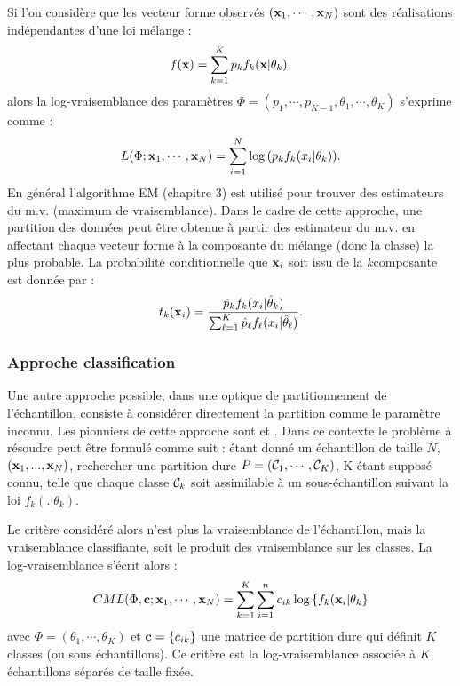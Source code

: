 Si l'on consid\`ere que les vecteur forme observ\'es 
$(\mbox{\bf x}_1,\cdots,\mbox{\bf x}_N)$ sont des r\'ealisations ind\'ependantes
d'une loi m\'elange :
$$
f(\mbox{\bf x})=\sum_{k=1}^K p_k f_k(\mbox{\bf x} | \theta_k),
$$
alors la log-vraisemblance des param\`etres 
$\Phi=(p_1,\cdots,p_{K-1},\theta_1,\cdots,\theta_K)$
s'exprime comme :
$$
L(\Phi ; \mbox{\bf x}_1,\cdots,\mbox{\bf x}_N)= \sum_{i=1}^{N} \log{ \left(p_k f_k(x_i | \theta_k)    \right )}.
$$
En g\'en\'eral l'algorithme EM (chapitre 3) est utilis\'e pour trouver
des estimateurs du m.v. (maximum de vraisemblance). Dans le cadre de cette
approche, une partition des donn\'ees peut \^etre obtenue \`a partir 
des estimateur du m.v. en affectant chaque vecteur forme \`a la 
composante du m\'elange (donc la classe) la plus probable. La 
probabilit\'e conditionnelle que $\mbox{\bf x}_i$ soit issu de la 
$k$\ieme composante est donn\'ee par :
\begin{equation}
\label{eq:tkxi}
t_k(\mbox{\bf x}_i)=\frac{\hat{p}_k f_k(x_i | \hat{\theta}_k) }{\sum_{\ell=1}^{K}
\hat{p}_{\ell} f_{\ell}(x_i | \hat{\theta}_{\ell})}.
\end{equation}


\subsubsection{Approche classification}

Une  autre approche possible, dans une optique de partitionnement
de l'\'echantillon, consiste \`a consid\'erer 
directement la partition comme le param\`etre inconnu. 
Les pionniers de cette approche sont 
et . Dans ce contexte le probl\`eme \`a r\'esoudre
peut \^etre formul\'e comme suit : \'etant donn\'e un \'echantillon
de taille $N$,  $(\mbox{\bf x}_1,...,\mbox{\bf x}_N)$, rechercher une partition dure
$P=({\cal C}_1,\cdots,{\cal C}_K)$, K \'etant suppos\'e connu, telle que 
chaque classe ${\cal C}_k$ soit assimilable \`a un sous-\'echantillon suivant
la loi $f_k(.|\theta_k)$.


Le crit\`ere consid\'er\'e alors n'est plus la vraisemblance de 
l'\'echantillon, mais la vraisemblance classifiante, soit le 
produit des vraisemblance sur les classes. La log-vraisemblance
s'\'ecrit alors :
\begin{equation}
CML(\Phi ,\mbox{\bf c} ; \mbox{\bf x}_1,\cdots,\mbox{\bf x}_N)=\sum_{k=1}^K \sum_{i=1}^n c_{ik }\log{ \{f_k(\mbox{\bf x}_i | \theta_k  \} }
\end{equation}
avec $\Phi=(\theta_1,\cdots,\theta_K)$ et $\mbox{\bf c}=\{ c_{ik}\}$ une matrice 
de partition dure qui d\'efinit $K$ classes (ou sous \'echantillons). 
Ce crit\`ere est la log-vraisemblance associ\'ee \`a $K$ \'echantillons
s\'epar\'es de taille fix\'ee.


